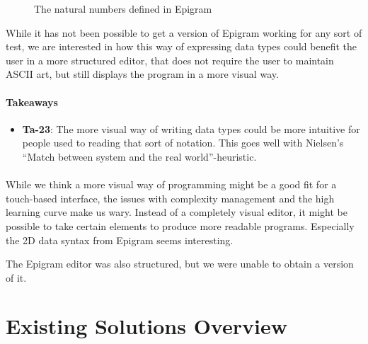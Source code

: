 \begin{figure}[htbp]
	\centering
	
	
	\caption{The natural numbers defined in Epigram}
\label{fig:epigram_data}
\end{figure}

While it has not been possible to get a version of Epigram working for any sort of test, we are interested in how this way of expressing data types could benefit the user in a more structured editor, that does not require the user to maintain ASCII art, but still displays the program in a more visual way.

\paragraph{Takeaways}
\begin{itemize}
	\item \textbf{Ta-23}: The more visual way of writing data types could be more intuitive for people used to reading that sort of notation. This goes well with Nielsen’s ``Match between system and the real world''-heuristic.
\end{itemize}

\paragraph{}

While we think a more visual way of programming might be a good fit for a touch-based interface, the issues with complexity management and the high learning curve make us wary.
Instead of a completely visual editor, it might be possible to take certain elements to produce more readable programs. 
Especially the 2D data syntax from Epigram seems interesting.

The Epigram editor was also structured, but we were unable to obtain a
version of it.


\section{Existing Solutions Overview}

